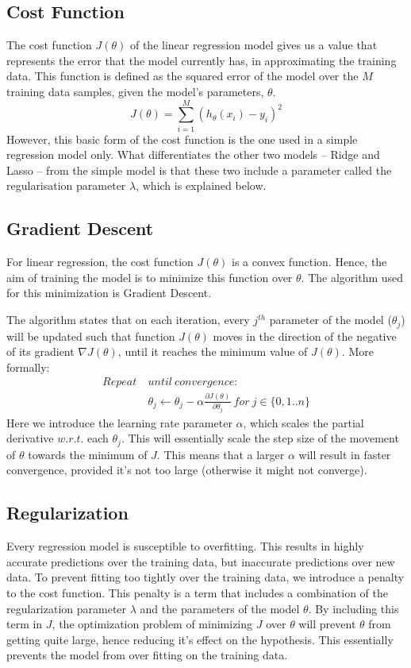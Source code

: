 \documentclass[letterpaper, 10 pt, conference]{ieeeconf}  %
\begin{document}
\subsection{Cost Function}
The cost function $J(\theta)$ of the linear regression model gives us a value that represents the error that the model currently has, in approximating the training data. This function is defined as the squared error of the model over the $M$ training data samples, given the model's parameters, $\theta$.
\[J(\theta) = \sum_{i=1}^{M}(h_\theta(x_i) - y_i)^2\]
However, this basic form of the cost function is the one used in a simple regression model only. What differentiates the other two models -- Ridge and Lasso -- from the simple model is that these two include a parameter called the regularisation parameter $\lambda$, which is explained below.

\subsection{Gradient Descent}
For linear regression, the cost function $J(\theta)$ is a convex function. Hence, the aim of training the model is to minimize this function over $\theta$. The algorithm used for this minimization is Gradient Descent.

The algorithm states that on each iteration, every  $j^{th}$ parameter of the model ($\theta_j$) will be updated such that function $J(\theta)$ moves in the direction of the negative of its gradient $\nabla J(\theta)$, until it reaches the minimum value of $J(\theta)$. More formally:
\begin{align*}
Repeat\ & until\ convergence: \\
& \theta_j \gets \theta_j - \alpha \frac{\partial J(\theta)}{\partial \theta_j}\ for\ j \in \{0,1..n\}
\end{align*}
Here we introduce the learning rate parameter $\alpha$, which scales the partial derivative $w.r.t.$ each $\theta_j$. This will essentially scale the step size of the movement of $\theta$ towards the minimum of $J$. This means that a larger $\alpha$ will result in faster convergence, provided it's not too large (otherwise it might not converge).

\subsection{Regularization}
Every regression model is susceptible to overfitting. This results in highly accurate predictions over the training data, but inaccurate predictions over new data. To prevent fitting too tightly over the training data, we introduce a penalty to the cost function. This penalty is a term that includes a combination of the regularization parameter $\lambda$ and the parameters of the model $\theta$. By including this term in $J$, the optimization problem of minimizing $J$ over $\theta$ will prevent $\theta$ from getting quite large, hence reducing it's effect on the hypothesis. This essentially prevents the model from over fitting on the training data.
\end{document}
